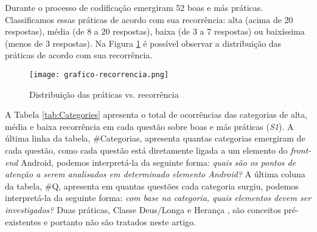 Durante o processo de codificação emergiram 52 boas e más práticas. Classificamos essas práticas de acordo com sua recorrência: alta (acima de 20 respostas), média (de 8 a 20 respostas), baixa (de 3 a 7 respostas) ou baixíssima (menos de 3 respostas). Na Figura \ref{fig:CategoriaXRecorrencia} é possível observar a distribuição das práticas de acordo com sua recorrência. 

\begin{figure}[!htb]
	\centering
	\texttt{[image: grafico-recorrencia.png]}
	\caption{Distribuição das práticas vs. recorrência}
	\label{fig:CategoriaXRecorrencia}
\end{figure}

A Tabela \ref{tab:Categories} apresenta o total de ocorrências das categorias de alta, média e baixa recorrência em cada questão sobre boas e más práticas (\textit{S1}). A última linha da tabela, \#Categorias, apresenta quantas categorias emergiram de cada questão, como cada questão está diretamente ligada a um elemento do \textit{front-end} Android, podemos interpretá-la da seguinte forma: \emph{quais são os pontos de atenção a serem analisados em determinado elemento Android?} A última coluna da tabela, \#Q, apresenta em quantas questões cada categoria surgiu, podemos interpretá-la da seguinte forma: \emph{com base na categoria, quais elementos devem ser investigados?} Duas práticas, Classe Deus/Longa \cite{Riel, RefactoringFowler1999} e Herança \cite{WikipediaInhiritance}, são conceitos pré-existentes e portanto não são tratados neste artigo. 




